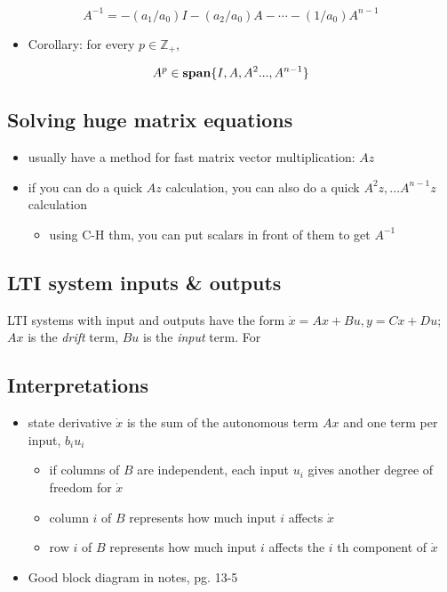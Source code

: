 \documentclass[10pt,letterpaper]{article}
\begin{document}
$$
A ^{-1} =  -(a_1 /a_0)I-(a_2 /a_0)A - \cdots -(1 /a_0) A ^{n-1} 
$$ 
\begin{itemize}
\item Corollary: for every $p \in \mathbb Z_+$,
\end{itemize}
$$A ^{p} \in {\bf span} \{I,A,A ^{2} ...,A ^{n-1} \}$$
\subsection{Solving huge matrix equations}
\label{sec-12_2}

\begin{itemize}
\item usually have a method for fast matrix vector multiplication: $Az$
\item if you can do a quick $Az$ calculation, you can also do a quick $A ^{2} z,...A ^{n-1} z$ calculation

\begin{itemize}
\item using C-H thm, you can put scalars in front of them to get $A^{-1}$
\end{itemize}

\end{itemize}
\subsection{LTI system inputs \& outputs}
\label{sec-12_3}

LTI systems with input and outputs have the form $\dot x=Ax+Bu, y=Cx+Du$; $Ax$ is the \emph{drift} term, $Bu$ is the \emph{input} term. For 
\subsection{Interpretations}
\label{sec-12_4}

\begin{itemize}
\item state derivative $\dot x$ is the sum of the autonomous term $Ax$ and one term per input, $b_i u_i$

\begin{itemize}
\item if columns of $B$ are independent, each input $u_i$ gives another degree of freedom for $\dot x$
\item column $i$ of $B$ represents how much input $i$ affects $\dot x$
\item row $i$ of $B$ represents how much input $i$ affects the $i$ th component of $\dot x$
\end{itemize}

\item Good block diagram in notes, pg. 13-5
\end{itemize}
\end{document}
